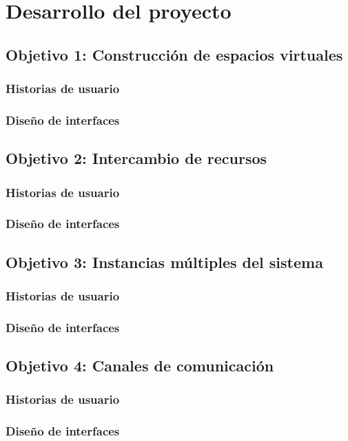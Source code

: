 \chapter{Desarrollo del proyecto}

\section{Objetivo 1: Construcción de espacios virtuales}
\subsection{Historias de usuario}
\subsection{Diseño de interfaces}

\section{Objetivo 2: Intercambio de recursos}
\subsection{Historias de usuario}
\subsection{Diseño de interfaces}

\section{Objetivo 3: Instancias múltiples del sistema}
\subsection{Historias de usuario}
\subsection{Diseño de interfaces}

\section{Objetivo 4: Canales de comunicación}
\subsection{Historias de usuario}
\subsection{Diseño de interfaces}

